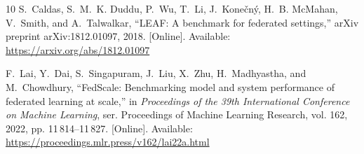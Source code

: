 \documentclass[journal]{IEEEtran}
\begin{document}
\begin{thebibliography}{10}
\BIBentryALTinterwordspacing
S.~Caldas, S.~M.~K. Duddu, P.~Wu, T.~Li, J.~Kone{\v{c}}n{\'y}, H.~B. McMahan,
  V.~Smith, and A.~Talwalkar, ``{LEAF}: A benchmark for federated settings,''
  arXiv preprint arXiv:1812.01097, 2018. [Online]. Available:
  \url{https://arxiv.org/abs/1812.01097}
\BIBentrySTDinterwordspacing

\BIBentryALTinterwordspacing
F.~Lai, Y.~Dai, S.~Singapuram, J.~Liu, X.~Zhu, H.~Madhyastha, and M.~Chowdhury,
  ``{FedScale}: Benchmarking model and system performance of federated learning
  at scale,'' in \emph{Proceedings of the 39th International Conference on
  Machine Learning}, ser. Proceedings of Machine Learning Research, vol. 162,
  2022, pp. 11\,814--11\,827. [Online]. Available:
  \url{https://proceedings.mlr.press/v162/lai22a.html}
\BIBentrySTDinterwordspacing

\end{thebibliography}

\end{document}
